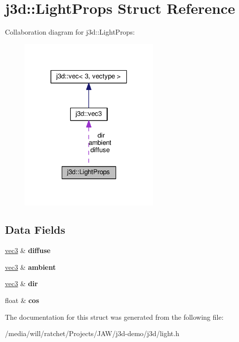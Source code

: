 \hypertarget{structj3d_1_1LightProps}{}\section{j3d\+:\+:Light\+Props Struct Reference}
\label{structj3d_1_1LightProps}


Collaboration diagram for j3d\+:\+:Light\+Props\+:
\nopagebreak
\begin{figure}[H]
\begin{center}
\leavevmode
\includegraphics[width=195pt]{structj3d_1_1LightProps__coll__graph}
\end{center}
\end{figure}
\subsection*{Data Fields}
\begin{DoxyCompactItemize}
\item 
\hypertarget{structj3d_1_1LightProps_a063a0292ff76b4d23dc89a45ea11c0fd}{}\hyperlink{structj3d_1_1vec3}{vec3} \& {\bfseries diffuse}\label{structj3d_1_1LightProps_a063a0292ff76b4d23dc89a45ea11c0fd}

\item 
\hypertarget{structj3d_1_1LightProps_a6543c47398038d83da7dbcb72d496d54}{}\hyperlink{structj3d_1_1vec3}{vec3} \& {\bfseries ambient}\label{structj3d_1_1LightProps_a6543c47398038d83da7dbcb72d496d54}

\item 
\hypertarget{structj3d_1_1LightProps_a23994a43d3779c7ea0aa567b1c2ad8b9}{}\hyperlink{structj3d_1_1vec3}{vec3} \& {\bfseries dir}\label{structj3d_1_1LightProps_a23994a43d3779c7ea0aa567b1c2ad8b9}

\item 
\hypertarget{structj3d_1_1LightProps_ab345d2308a17b174326cb1e0f62890aa}{}float \& {\bfseries cos}\label{structj3d_1_1LightProps_ab345d2308a17b174326cb1e0f62890aa}

\end{DoxyCompactItemize}


The documentation for this struct was generated from the following file\+:\begin{DoxyCompactItemize}
\item 
/media/will/ratchet/\+Projects/\+J\+A\+W/j3d-\/demo/j3d/light.\+h\end{DoxyCompactItemize}
